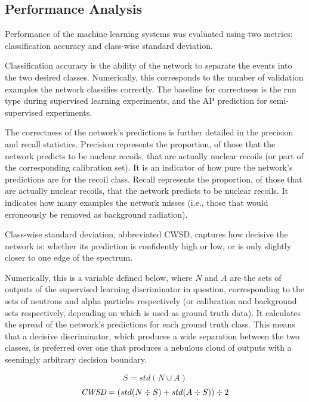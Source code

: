 \documentclass[10pt]{article}
\begin{document}
\subsection{Performance Analysis}

Performance of the machine learning systems was evaluated using two metrics: classification accuracy and class-wise standard deviation.

Classification accuracy is the ability of the network to separate the events into the two desired classes. Numerically, this corresponds to the number of validation examples the network classifies correctly. The baseline for correctness is the run type during supervised learning experiments, and the AP prediction for semi-supervised experiments.

The correctness of the network's predictions is further detailed in the precision and recall statistics. Precision represents the proportion, of those that the network predicts to be nuclear recoils, that are actually nuclear recoils (or part of the corresponding calibration set). It is an indicator of how pure the network's predictions are for the recoil class. Recall represents the proportion, of those that are actually nuclear recoils, that the network predicts to be nuclear recoils. It indicates how many examples the network misses (i.e., those that would erroneously be removed as background radiation).

Class-wise standard deviation, abbreviated CWSD, captures how decisive the network is: whether its prediction is confidently high or low, or is only slightly closer to one edge of the spectrum.

Numerically, this is a variable defined below, where $N$ and $A$ are the sets of outputs of the supervised learning discriminator in question, corresponding to the sets of neutrons and alpha particles respectively (or calibration and background sets respectively, depending on which is used as ground truth data). It calculates the spread of the network's predictions for each ground truth class. This means that a decisive discriminator, which produces a wide separation between the two classes, is preferred over one that produces a nebulous cloud of outputs with a seemingly arbitrary decision boundary.

\begin{equation}
    S=std(N \cup A)
\end{equation}
\begin{equation}
    \mbox{\it CWSD}=(std(N \div S) + std(A \div S)) \div 2
\end{equation}
\end{document}
